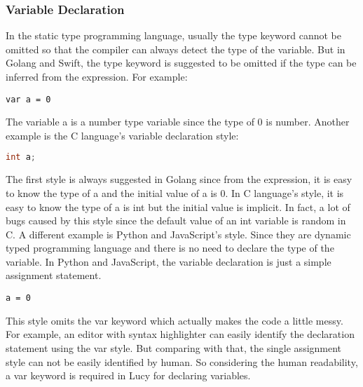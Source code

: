 \subsubsection{Variable Declaration}
In the static type programming language, usually the type keyword cannot be omitted so that the compiler can always detect the type of the variable. But in Golang and Swift, the type keyword is suggested to be omitted if the type can be inferred from the expression. For example:
\begin{lstlisting}
var a = 0
\end{lstlisting}
The variable a is a number type variable since the type of 0 is number. Another example is the C language's variable declaration style:
\begin{lstlisting}[language=c]
int a;
\end{lstlisting}
The first style is always suggested in Golang since from the expression, it is easy to know the type of a and the initial value of a is 0. In C language's style, it is easy to know the type of a is int but the initial value is implicit. In fact, a lot of bugs caused by this style since the default value of an int variable is random in C.
A different example is Python and JavaScript's style. Since they are dynamic typed programming language and there is no need to declare the type of the variable. In Python and JavaScript, the variable declaration is just a simple assignment statement.
\begin{lstlisting}
a = 0
\end{lstlisting}
This style omits the var keyword which actually makes the code a little messy. For example, an editor with syntax highlighter can easily identify the declaration statement using the var style. But comparing with that, the single assignment style can not be easily identified by human. So considering the human readability, a var keyword is required in Lucy for declaring variables.

